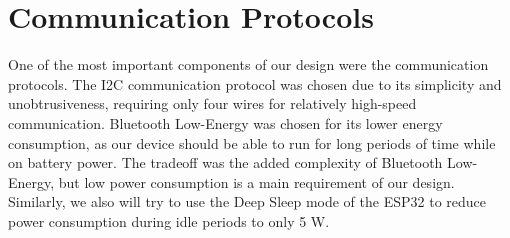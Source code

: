\section{Communication Protocols}
One of the most important components of our design were the communication protocols. The I2C communication protocol was chosen due to its simplicity and unobtrusiveness, requiring only four wires for relatively high-speed communication. Bluetooth Low-Energy was chosen for its lower energy consumption, as our device should be able to run for long periods of time while on battery power. The tradeoff was the added complexity of Bluetooth Low-Energy, but low power consumption is a main requirement of our design. Similarly, we also will try to use the Deep Sleep mode of the ESP32 to reduce power consumption during idle periods to only 5 W.



